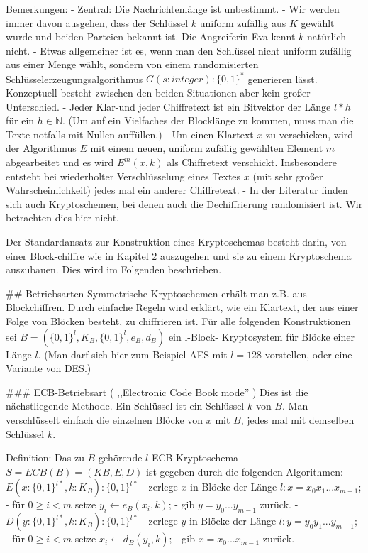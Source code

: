 \documentclass[a4paper]{article}
\begin{document}
\begin{multicols}{3}
        Bemerkungen:
        - Zentral: Die Nachrichtenlänge ist unbestimmt.
        - Wir werden immer davon ausgehen, dass der Schlüssel $k$ uniform zufällig aus $K$ gewählt wurde und beiden Parteien bekannt ist. Die Angreiferin Eva kennt $k$ natürlich nicht.
        - Etwas allgemeiner ist es, wenn man den Schlüssel nicht uniform zufällig aus einer Menge wählt, sondern von einem randomisierten Schlüsselerzeugungsalgorithmus $G(s:integer):\{0,1\}^*$ generieren lässt. Konzeptuell besteht zwischen den beiden Situationen aber kein großer Unterschied.
        - Jeder Klar-und jeder Chiffretext ist ein Bitvektor der Länge $l*h$ für ein $h\in\mathbb{N}$. (Um auf ein Vielfaches der Blocklänge zu kommen, muss man die Texte notfalls mit Nullen auffüllen.)
        - Um einen Klartext $x$ zu verschicken, wird der Algorithmus $E$ mit einem neuen, uniform zufällig gewählten Element $m$ abgearbeitet und es wird $E^m(x,k)$ als Chiffretext verschickt. Insbesondere entsteht bei wiederholter Verschlüsselung eines Textes $x$ (mit sehr großer Wahrscheinlichkeit) jedes mal ein anderer Chiffretext.
        - In der Literatur finden sich auch Kryptoschemen, bei denen auch die Dechiffrierung randomisiert ist. Wir betrachten dies hier nicht.

        Der Standardansatz zur Konstruktion eines Kryptoschemas besteht darin, von einer Block-chiffre wie in Kapitel 2 auszugehen und sie zu einem Kryptoschema auszubauen. Dies wird im Folgenden beschrieben.

        ## Betriebsarten
        Symmetrische Kryptoschemen erhält man z.B. aus Blockchiffren. Durch einfache Regeln wird erklärt, wie ein Klartext, der aus einer Folge von Blöcken besteht, zu chiffrieren ist. Für alle folgenden Konstruktionen sei $B=(\{0,1\}^l,K_B,\{0,1\}^l,e_B,d_B)$ ein l-Block-
        Kryptosystem für Blöcke einer Länge $l$. (Man darf sich hier zum Beispiel AES mit $l=128$ vorstellen, oder eine Variante von DES.)

        ### ECB-Betriebsart ( ,,Electronic Code Book mode'' )
        Dies ist die nächstliegende Methode. Ein Schlüssel ist ein Schlüssel $k$ von $B$. Man verschlüsselt einfach die einzelnen Blöcke von $x$ mit $B$, jedes mal mit demselben Schlüssel $k$.

        Definition: Das zu $B$ gehörende $l$-ECB-Kryptoschema $S=ECB(B)=(KB,E,D)$ ist gegeben durch die folgenden Algorithmen:
        - $E(x:\{0,1\}^{l*},k:K_B) :\{0,1\}^{l*}$
        - zerlege $x$ in Blöcke der Länge $l:x=x_0 x_1 ...x_{m-1}$;
        - für $0\geq i < m$ setze $y_i\leftarrow e_B(x_i,k)$;
        - gib $y=y_0 ...y_{m-1}$ zurück.
        - $D(y:\{0,1\}^{l*},k:K_B) :\{0,1\}^{l*}$
        - zerlege $y$ in Blöcke der Länge $l:y=y_0 y_1 ...y_{m-1}$;
        - für $0\geq i < m$ setze $x_i\leftarrow d_B(y_i,k)$;
        - gib $x=x_0 ...x_{m-1}$ zurück.


\end{multicols}
\end{document}
